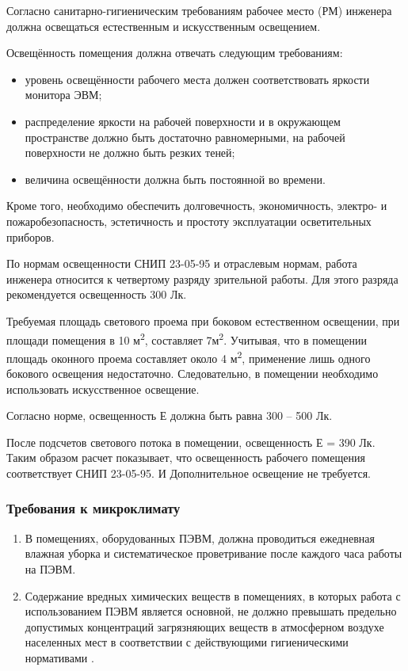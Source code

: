 Согласно санитарно-гигиеническим требованиям рабочее место (РМ) инженера должна освещаться естественным и искусственным освещением.

Освещённость помещения должна отвечать следующим требованиям\cite{OT1}:

\begin{itemize}
 \item уровень освещённости рабочего места должен соответствовать яркости монитора ЭВМ;
 \item распределение яркости на рабочей поверхности и в окружающем пространстве должно быть достаточно равномерными, на рабочей поверхности не должно быть резких теней;
 \item величина освещённости должна быть постоянной во времени.
\end{itemize}

Кроме того, необходимо обеспечить долговечность, экономичность, электро- и пожаробезопасность, эстетичность и простоту эксплуатации осветительных приборов.

По нормам освещенности СНИП 23-05-95 и отраслевым нормам, работа инженера относится к четвертому разряду зрительной работы. Для этого разряда рекомендуется освещенность 300 Лк. 

Требуемая площадь светового проема при боковом естественном освещении, при площади помещения в 10 м\textsuperscript{2}, составляет 7м\textsuperscript{2}. Учитывая, что в помещении площадь оконного проема составляет около 4 м\textsuperscript{2}, применение лишь одного бокового освещения недостаточно. Следовательно, в помещении необходимо использовать искусственное освещение. 

Согласно норме, освещенность Е должна быть равна 300 – 500 Лк. 

После подсчетов светового потока в помещении, освещенность Е = 390 Лк. Таким образом расчет показывает, что освещенность рабочего помещения соответствует СНИП 23-05-95. И Дополнительное освещение не требуется.

\subsubsection{Требования к микроклимату}

\begin{enumerate}
 \item В помещениях, оборудованных ПЭВМ, должна проводиться ежедневная влажная уборка и систематическое проветривание после каждого часа работы на ПЭВМ.
 \item Содержание вредных химических веществ в помещениях, в которых работа с использованием ПЭВМ является основной, не должно превышать предельно допустимых концентраций загрязняющих веществ в атмосферном воздухе населенных мест в соответствии с действующими гигиеническими нормативами \cite{OT2}.
\end{enumerate}

